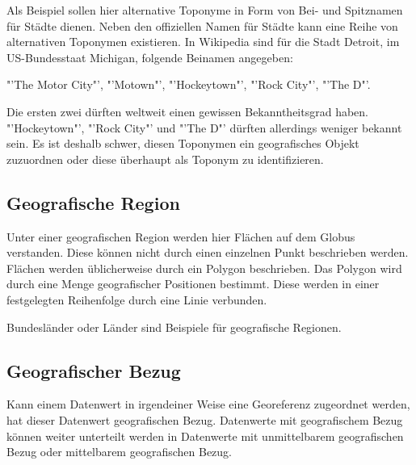 \begin{description}
			  		Als Beispiel sollen hier alternative Toponyme in Form von Bei- und Spitznamen für Städte dienen.
					Neben den offiziellen Namen für Städte kann eine Reihe von alternativen Toponymen existieren.
					In Wikipedia sind für die Stadt Detroit, im US-Bundesstaat Michigan, folgende Beinamen angegeben: 

					 "'The Motor City"', "'Motown"', "'Hockeytown"', "'Rock City"', "'The D"'.

					Die ersten zwei dürften weltweit einen gewissen Bekanntheitsgrad haben. 
					"'Hockeytown"', "'Rock City"' und "'The D"' dürften allerdings weniger bekannt sein.
					Es ist deshalb schwer, diesen Toponymen ein geografisches Objekt zuzuordnen oder diese überhaupt als Toponym zu identifizieren.

			\end{description}  

		\subsection{Geografische Region} 
			
			Unter einer geografischen Region werden hier Flächen auf dem Globus verstanden.
			Diese können nicht durch einen einzelnen Punkt beschrieben werden. 
			Flächen werden üblicherweise durch ein Polygon beschrieben. 
			Das Polygon wird durch eine Menge geografischer Positionen bestimmt.
			Diese werden in einer festgelegten Reihenfolge durch eine Linie verbunden.

			Bundesländer oder Länder sind Beispiele für geografische Regionen.
			
		\subsection{Geografischer Bezug} 

			Kann einem Datenwert in irgendeiner Weise eine Georeferenz zugeordnet werden, hat dieser Datenwert geografischen Bezug.
			Datenwerte mit geografischem Bezug können weiter unterteilt werden in Datenwerte mit unmittelbarem geografischen Bezug oder mittelbarem geografischen Bezug. 

